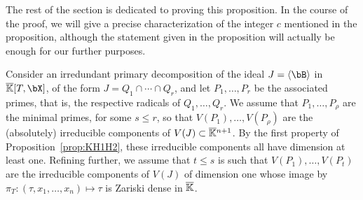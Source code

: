 \documentclass[12pt]{article}
\begin{document}
The rest of the section is dedicated to proving this proposition.
In the course of the proof, we will give a precise characterization of
the integer $c$ mentioned in the proposition, although the statement
given in the proposition will actually be enough for our further
purposes.

Consider an irredundant primary decomposition of the ideal $J=\langle
\bB\rangle$ in $\KKbar[T,\bX]$, of the form $J=Q_1 \cap \cdots \cap
Q_r$, and let $P_1,\dots,P_r$ be the associated primes, that is, the
respective radicals of $Q_1,\dots,Q_r$. We assume that $P_1,\dots,P_\rho$
are the minimal primes, for some $s \le r$, so that
$V(P_1),\dots,V(P_\rho)$ are the (absolutely) irreducible components of
$V(J)\subset \overline{\mathbb{K}}{}^{n+1}$. By the first property of
Proposition~\ref{prop:KH1H2}, these irreducible components all have
dimension at least one. Refining further, we assume that $t \le s$ is
such that $V(P_1),\dots,V(P_t)$ are the irreducible components of
$V(J)$ of dimension one whose image by $\pi_T: (\tau,x_1,\dots,x_n)
\mapsto \tau$ is Zariski dense in $\overline{\mathbb{K}}$.
\end{document}
